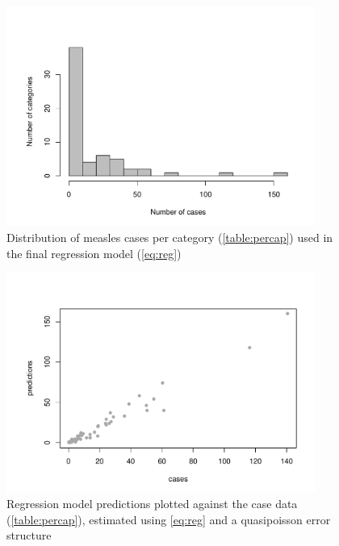 \documentclass{article}
\begin{document}
\begin{figure}
\begin{center}
     \includegraphics[width=0.9\textwidth]{Cases_regmodel.pdf}
\end{center}
\caption{Distribution of measles cases per category (\autoref{table:percap}) used in the final regression model (\autoref{eq:reg})}
\label{fig:histcasecat}
\end{figure}

\begin{figure}
\begin{center}
     \includegraphics[width=0.9\textwidth]{Cases_regmodel_prediction.pdf}
\end{center}
\caption{Regression model predictions plotted against the case data (\autoref{table:percap}), estimated using \autoref{eq:reg} and a quasipoisson error structure}
\label{fig:predict}
\end{figure}
\end{document}
